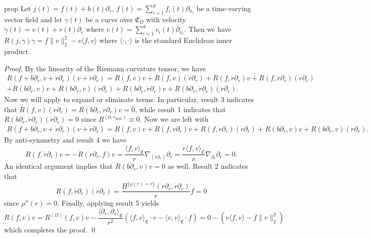 \documentclass{article}
\begin{document}
\begin{restatable}{prop}{} \label{jacobi equation on cone p2}
    Let $j(t) = f(t) + b(t)\partial_r$, $f(t) = \sum_{i = 1}^df_i(t)\partial_{x_i}$ be a time-varying vector field and let $\gamma(t)$ be a curve over $\mathfrak{C}_\Omega$ with velocity $\dot \gamma(t) = v(t) + \dot r(t)\partial_r$ where $v(t) = \sum_{i = 1}^dv_i(t)\partial_{x_i}$. Then we have $R(j, \dot \gamma)\dot \gamma = f\|v\|_2^2 - v\langle f, v\rangle$ where $\langle \cdot, \cdot \rangle$ is the standard Euclidean inner product.  
\end{restatable}
\noindent \textit{Proof.} By the linearity of the Riemann curvature tensor, we have
\begin{multline*}
    R(f + b\partial_r, v  + \dot r\partial_r)(v + \dot r\partial_r)  = R(f, v)v + R(f, v)(\dot r\partial_r) + R(f, \dot r\partial_r)v + R(f, \dot r\partial_r)(\dot r\partial_r)\\ + R(b\partial_r, v)v + R(b\partial_r, v)(\dot r\partial_r) + R(b\partial_r, \dot r\partial_r)v + R(b\partial_r, \dot r\partial_r)(\dot r\partial_r).
\end{multline*}
Now we will apply  to expand or eliminate terms. In particular, result 3 indicates that $R(f,v)(\dot r\partial_r) = R(b\partial_r, \dot r\partial_r)v = 0$, while result 1 indicates that $R(b\partial_r, \dot r\partial_r)(\dot r \partial_r) = 0$ since $R^{(0, r_{\max})} \equiv 0$. Now we are left with
\begin{align*}
    R(f + b\partial_r, v  + \dot r\partial_r)(v + \dot r\partial_r)  = R(f, v)v + R(f, \dot r\partial_r)v + R(f, \dot r\partial_r)(\dot r\partial_r) + R(b\partial_r, v)v + R(b\partial_r, v)(\dot r\partial_r).
\end{align*}
By anti-symmetry and result 4 we have
\[R(f, \dot r\partial_r)v = -R(\dot r\partial_r, f)v = \frac{\langle f, v \rangle_{\mathfrak{C}}}{r}\nabla_{(\dot r\partial_r)}\partial_r = \frac{\dot r\langle f, v \rangle_{\mathfrak{C}}}{r}\nabla_{\partial_r}\partial_r = 0.\]
An identical argument implies that $R(b\partial_r, v)v = 0$ as well. Result 2 indicates that
\[R(f, \dot r\partial_r)(\dot r\partial_r) = \frac{H^{\{\rho(r) = r\}}(\dot r\partial _r, \dot r\partial_r)}{r}f = 0\]
since $\rho''(r) = 0$. Finally, applying result 5 yields
\[R(f,v)v = R^{(\Omega)}(f,v)v - \frac{\langle \partial_r, \partial_r\rangle_{\mathfrak{C}}}{r^2}\left(\langle f, v\rangle_{\mathfrak{C}}\cdot v - \langle v, v\rangle_{\mathfrak{C}}\cdot f\right) = 0 - (v\langle f, v\rangle - f\|v\|_2^2)\]
which completes the proof. \qed{}
\end{document}
